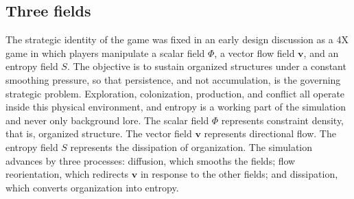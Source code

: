 \documentclass[11pt]{article}
\begin{document}
\subsection{Three fields}

The strategic identity of the game was fixed in an early design discussion as a 4X game in which players manipulate a scalar field $\Phi$, a vector flow field $\mathbf{v}$, and an entropy field $S$. The objective is to sustain organized structures under a constant smoothing pressure, so that persistence, and not accumulation, is the governing strategic problem. Exploration, colonization, production, and conflict all operate inside this physical environment, and entropy is a working part of the simulation and never only background lore. The scalar field $\Phi$ represents constraint density, that is, organized structure. The vector field $\mathbf{v}$ represents directional flow. The entropy field $S$ represents the dissipation of organization. The simulation advances by three processes: diffusion, which smooths the fields; flow reorientation, which redirects $\mathbf{v}$ in response to the other fields; and dissipation, which converts organization into entropy.
\end{document}
